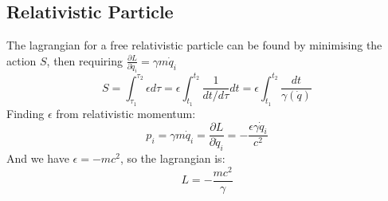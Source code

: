 \documentclass[table,cmyk]{article}
\begin{document}
\begin{longtable}
  \subsection*{Relativistic Particle}
  The lagrangian for a free relativistic particle can be found by minimising the
  action $S$, then requiring $\frac{\partial L}{\partial \dot q_i}=\gamma m \dot
  q_i$
  \begin{displaymath}
   S=
   \int_{\tau_1}^{\tau_2}\epsilon d\tau=\epsilon\int_{t_1}^{t_2}\frac{1}{dt/d\tau}dt
    =\epsilon\int_{t_1}^{t_2}\frac{dt}{\gamma(\dot q)}
  \end{displaymath}
  Finding $\epsilon$ from relativistic momentum:
  \begin{displaymath}
    p_i=\gamma m \dot q_i=\frac{\partial L}{\partial \dot
      q_i}=-\frac{\epsilon\gamma\dot q_i}{c^2}
  \end{displaymath}
  And we have $\epsilon = -mc^2$, so the lagrangian is:
  \begin{displaymath}
   L=-\frac{mc^2}{\gamma} 
  \end{displaymath}
\tabularnewline\hline

\end{longtable}
\end{document}
